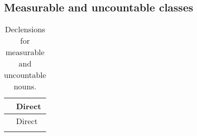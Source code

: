 \documentclass{book}
\begin{document}
\subsection{Measurable and uncountable classes}

\newcommand{\overcolm}{& \textnormal{Direct}}
\begin{longtabu}{|r|>{\kardinal}Y|}
    \caption{Declensions for measurable and uncountable nouns. \label{table:ndecm}} \\
    
    \hline
    \overcolm \\
    \endfirsthead
    
    \hline
    \overcolm \\
    \hline
    \endhead
    
    \hline
    \endfoot
    
    \hline
    \endlastfoot
    

\end{longtabu}
\end{document}
